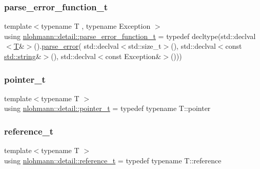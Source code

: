 \subsubsection{\texorpdfstring{parse\_error\_function\_t}{parse\_error\_function\_t}}
{\footnotesize\ttfamily template$<$typename T , typename Exception $>$ \\
using \mbox{\hyperlink{namespacenlohmann_1_1detail_a264d4d58bc1fd82bcc7bf6bf73d6acad}{nlohmann\+::detail\+::parse\+\_\+error\+\_\+function\+\_\+t}} = typedef decltype(std\+::declval$<$\mbox{\hyperlink{_keyboard_event_8h_adf1f3edb9115acb0a1e04209b7a9937b}{T}}\&$>$().\mbox{\hyperlink{classnlohmann_1_1detail_1_1parse__error}{parse\+\_\+error}}( std\+::declval$<$std\+::size\+\_\+t$>$(), std\+::declval$<$const \mbox{\hyperlink{namespacenlohmann_1_1detail_a1ed8fc6239da25abcaf681d30ace4985ab45cffe084dd3d20d928bee85e7b0f21}{std\+::string}}\&$>$(), std\+::declval$<$const Exception\&$>$()))}

\mbox{\label{namespacenlohmann_1_1detail_a26dc71e2dd9336587e56062178f9abce}} 
\subsubsection{\texorpdfstring{pointer\_t}{pointer\_t}}
{\footnotesize\ttfamily template$<$typename T $>$ \\
using \mbox{\hyperlink{namespacenlohmann_1_1detail_a26dc71e2dd9336587e56062178f9abce}{nlohmann\+::detail\+::pointer\+\_\+t}} = typedef typename T\+::pointer}

\mbox{\label{namespacenlohmann_1_1detail_a082bdafd3b4c61d9d1e92b35b8f75ee3}} 
\subsubsection{\texorpdfstring{reference\_t}{reference\_t}}
{\footnotesize\ttfamily template$<$typename T $>$ \\
using \mbox{\hyperlink{namespacenlohmann_1_1detail_a082bdafd3b4c61d9d1e92b35b8f75ee3}{nlohmann\+::detail\+::reference\+\_\+t}} = typedef typename T\+::reference}

